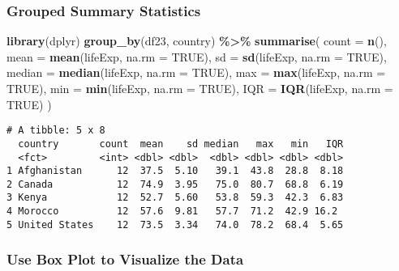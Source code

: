 \documentclass[
]{article}
\newenvironment{Shaded}{\begin{snugshade}}{\end{snugshade}}
\newcommand{\AttributeTok}[1]{\textcolor[rgb]{0.13,0.29,0.53}{#1}}
\newcommand{\ConstantTok}[1]{\textcolor[rgb]{0.56,0.35,0.01}{#1}}
\newcommand{\FunctionTok}[1]{\textcolor[rgb]{0.13,0.29,0.53}{\textbf{#1}}}
\newcommand{\NormalTok}[1]{#1}
\newcommand{\SpecialCharTok}[1]{\textcolor[rgb]{0.81,0.36,0.00}{\textbf{#1}}}
\begin{document}
\hypertarget{grouped-summary-statistics}{%
\subsubsection{Grouped Summary
Statistics}\label{grouped-summary-statistics}}

\begin{Shaded}
\begin{Highlighting}[]
\FunctionTok{library}\NormalTok{(dplyr)}
\FunctionTok{group\_by}\NormalTok{(df23, country) }\SpecialCharTok{\%\textgreater{}\%}
  \FunctionTok{summarise}\NormalTok{(}
    \AttributeTok{count =} \FunctionTok{n}\NormalTok{(),}
    \AttributeTok{mean =} \FunctionTok{mean}\NormalTok{(lifeExp, }\AttributeTok{na.rm =} \ConstantTok{TRUE}\NormalTok{),}
    \AttributeTok{sd =} \FunctionTok{sd}\NormalTok{(lifeExp, }\AttributeTok{na.rm =} \ConstantTok{TRUE}\NormalTok{),}
    \AttributeTok{median =} \FunctionTok{median}\NormalTok{(lifeExp, }\AttributeTok{na.rm =} \ConstantTok{TRUE}\NormalTok{),}
    \AttributeTok{max =} \FunctionTok{max}\NormalTok{(lifeExp, }\AttributeTok{na.rm =} \ConstantTok{TRUE}\NormalTok{),}
    \AttributeTok{min =} \FunctionTok{min}\NormalTok{(lifeExp, }\AttributeTok{na.rm =} \ConstantTok{TRUE}\NormalTok{),}
    \AttributeTok{IQR =} \FunctionTok{IQR}\NormalTok{(lifeExp, }\AttributeTok{na.rm =} \ConstantTok{TRUE}\NormalTok{)}
\NormalTok{  )}
\end{Highlighting}
\end{Shaded}

\begin{verbatim}
# A tibble: 5 x 8
  country       count  mean    sd median   max   min   IQR
  <fct>         <int> <dbl> <dbl>  <dbl> <dbl> <dbl> <dbl>
1 Afghanistan      12  37.5  5.10   39.1  43.8  28.8  8.18
2 Canada           12  74.9  3.95   75.0  80.7  68.8  6.19
3 Kenya            12  52.7  5.60   53.8  59.3  42.3  6.83
4 Morocco          12  57.6  9.81   57.7  71.2  42.9 16.2 
5 United States    12  73.5  3.34   74.0  78.2  68.4  5.65
\end{verbatim}

\hypertarget{use-box-plot-to-visualize-the-data}{%
\subsubsection{Use Box Plot to Visualize the
Data}\label{use-box-plot-to-visualize-the-data}}
\end{document}
